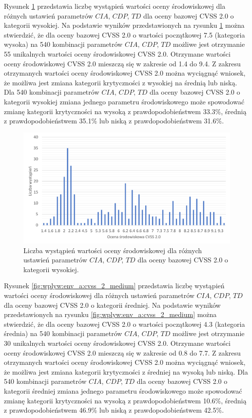 \bigbreak
Rysunek \ref{fig:wplyw:env_a:cvss_2_high} przedstawia liczbę wystąpień wartości oceny środowiskowej dla różnych ustawień parametrów $CIA$, $CDP$, $TD$ dla oceny bazowej CVSS 2.0 o kategorii wysokiej. Na podstawie wyników przedstawionych na rysunku \ref{fig:wplyw:env_a:cvss_2_high} można stwierdzić, że dla oceny bazowej CVSS 2.0 o wartości początkowej 7.5 (kategoria wysoka) na 540 kombinacji parametrów $CIA$, $CDP$, $TD$ możliwe jest otrzymanie 55 unikalnych wartości oceny środowiskowej CVSS 2.0. Otrzymane wartości oceny środowiskowej CVSS 2.0 mieszczą się w zakresie od 1.4 do 9.4. Z zakresu otrzymanych wartości oceny środowiskowej CVSS 2.0 można wyciągnąć wniosek, że możliwa jest zmiana kategorii krytyczności z wysokiej na średnią lub niską. Dla 540 kombinacji parametrów $CIA$, $CDP$, $TD$ dla oceny bazowej CVSS 2.0 o kategorii wysokiej zmiana jednego parametru środowiskowego może spowodować zmianę kategorii krytyczności na wysoką z prawdopodobieństwem 33.3\%, średnią z prawdopodobieństwem 35.1\% lub niską z prawdopodobieństwem 31.6\%.

\begin{figure}[!ht]
\centering
\includegraphics[width=.9\textwidth]{Chapters/Wplyw/cvss2/cvss_2_high.pdf}
\caption{Liczba wystąpień wartości oceny środowiskowej dla różnych ustawień parametrów $CIA$, $CDP$, $TD$ dla oceny bazowej CVSS 2.0 o kategorii wysokiej.}
\label{fig:wplyw:env_a:cvss_2_high}
\end{figure}

\bigbreak
Rysunek \ref{fig:wplyw:env_a:cvss_2_medium} przedstawia liczbę wystąpień wartości oceny środowiskowej dla różnych ustawień parametrów $CIA$, $CDP$, $TD$ dla oceny bazowej CVSS 2.0 o kategorii średniej. Na podstawie wyników przedstawionych na rysunku \ref{fig:wplyw:env_a:cvss_2_medium} można stwierdzić, że dla oceny bazowej CVSS 2.0 o wartości początkowej 4.3 (kategoria średnia) na 540 kombinacji parametrów $CIA$, $CDP$, $TD$ możliwe jest otrzymanie 30 unikalnych wartości oceny środowiskowej CVSS 2.0. Otrzymane wartości oceny środowiskowej CVSS 2.0 mieszczą się w zakresie od 0.8 do 7.7. Z zakresu otrzymanych wartości oceny środowiskowej CVSS 2.0 można wyciągnąć wniosek, że możliwa jest zmiana kategorii krytyczności z średniej na wysoką lub niską. Dla 540 kombinacji parametrów $CIA$, $CDP$, $TD$ dla oceny bazowej CVSS 2.0 o kategorii średniej zmiana jednego parametru środowiskowego może spowodować zmianę kategorii krytyczności na wysoką z prawdopodobieństwem 10.6\%, średnią z prawdopodobieństwem 46.9\% lub niską z prawdopodobieństwem 42.5\%.


